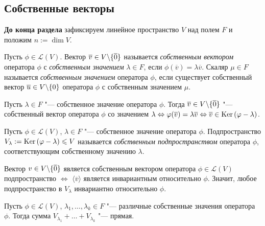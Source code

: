\subsection{Собственные векторы}

\textbf{До конца раздела} зафиксируем линейное пространство $V$ над полем $F$ и положим $n := \dim{V}$.

\begin{definition}
	Пусть $\phi \in \mathcal{L}(V)$. Вектор $\overline{v} \in V \backslash \{\overline 0\}$ называется \textit{собственным вектором} оператора $\phi$ с \textit{собственным значением} $\lambda \in F$, если $\phi(\overline{v}) = \lambda\overline{v}$. Скаляр $\mu \in F$ называется \textit{собственным значением} оператора $\phi$, если существует собственный вектор $\overline{u} \in V \backslash \{0\}$ оператора $\phi$ с собственным значением $\mu$.
\end{definition}

\begin{note}
	Пусть $\lambda \in F$ "--- собственное значение оператора $\phi$. Тогда $\overline{v} \in V \backslash \{\overline 0\}$ "--- собственный вектор оператора $\phi$ со значением $\lambda \hm{\Leftrightarrow} \phi(\overline{v}) = \lambda\overline{v} \hm{\Leftrightarrow} \overline{v} \hm{\in} \ke{(\phi - \lambda)}$.
\end{note}

\begin{definition}
	Пусть $\phi \in \mathcal{L}(V)$, $\lambda \in F$ "--- собственное значение оператора $\phi$. Подпространство $V_\lambda := \operatorname{Ker}{(\varphi - \lambda)} \leqslant V$ называется \textit{собственным подпространством} оператора $\phi$, соответствующим собственному значению $\lambda$.
\end{definition}

\begin{note}
	Вектор $v \in V \backslash \{\overline{0}\}$ является собственным вектором оператора $\phi \in \mathcal{L}(V)$ подпространство $\Leftrightarrow$ $\langle \overline{v} \rangle$ является инвариантным относительно $\phi$. Значит, любое подпространство в $V_\lambda$ инвариантно относительно $\phi$.
\end{note}

\begin{theorem}
	Пусть $\phi \in \mathcal{L}(V)$, $\lambda_1, \dots, \lambda_k \in F$ "--- различные собственные значения оператора $\phi$. Тогда сумма $V_{\lambda_1} + \dots + V_{\lambda_k}$ "--- прямая.
\end{theorem}

